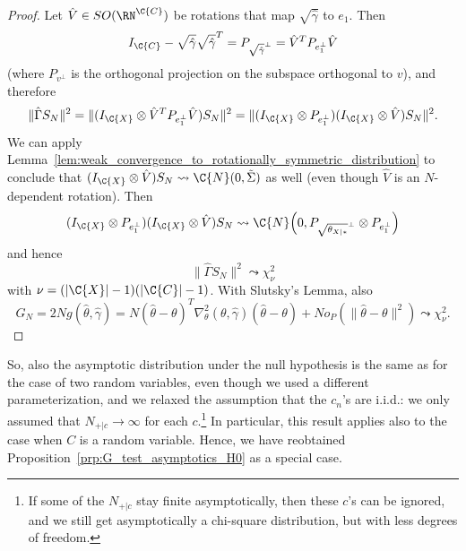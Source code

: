 \begin{proof}

  Let $\hat V \in SO(\RN^{\C{C}})$ be rotations that map $\sqrt{\hat\gamma}$ to $e_1$. Then
  $$I_{\C{C}} - \sqrt{\hat\gamma} \sqrt{\hat\gamma}^T = P_{\sqrt{\hat\gamma}^\perp} = \hat V^T P_{e_1^\perp} \hat V$$
  (where $P_{v^\perp}$ is the orthogonal projection on the subspace orthogonal to $v$),
  and therefore
  $$\lVert \hat\Gamma S_N \rVert^2 = \lVert (I_{\C{X}} \otimes \hat V^T P_{e_1^\perp} \hat V) S_N \rVert^2
    = \lVert (I_{\C{X}} \otimes P_{e_1^\perp})(I_{\C{X}} \otimes \hat V) S_N \rVert^2.$$
  We can apply Lemma~\ref{lem:weak_convergence_to_rotationally_symmetric_distribution} to conclude that $(I_{\C{X}} \otimes \hat V) S_N \leadsto \C{N}(0,\tilde\Sigma)$ as well (even though $\hat V$ is an $N$-dependent rotation).
  Then 
  $$(I_{\C{X}} \otimes P_{e_1^\perp})(I_{\C{X}} \otimes \hat V) S_N \leadsto \C{N}\Big(0,P_{\sqrt{\theta_{X|\ast}}^\perp} \otimes P_{e_1^\perp}\Big)$$
  and hence
  $$\lVert \hat\Gamma S_N \rVert^2 \leadsto \chi^2_{\nu}$$
  with $\nu = (|\C{X}|-1)(|\C{C}|-1)$.
  With Slutsky's Lemma, also
  $$G_N = 2N g(\hat\theta,\hat\gamma) = N (\hat\theta - \theta)^T \nabla_\theta^2(\theta,\hat\gamma) (\hat\theta - \theta) + N o_P(\lVert\hat\theta - \theta\rVert^2) \leadsto \chi^2_{\nu}.$$
\end{proof}
So, also the asymptotic distribution under the null hypothesis is the same as for the case of two random variables, 
even though we used a different parameterization,
and we relaxed the assumption that the $c_n$'s are i.i.d.:
we only assumed that $N_{+|c} \to \infty$ for each $c$.\footnote{If some of the $N_{+|c}$ stay finite asymptotically, then these $c$'s can be ignored, and we still get asymptotically a chi-square distribution, but with less degrees of freedom.}
In particular, this result applies also to the case when
$C$ is a random variable. Hence, we have reobtained Proposition~\ref{prp:G_test_asymptotics_H0} as a special case.

